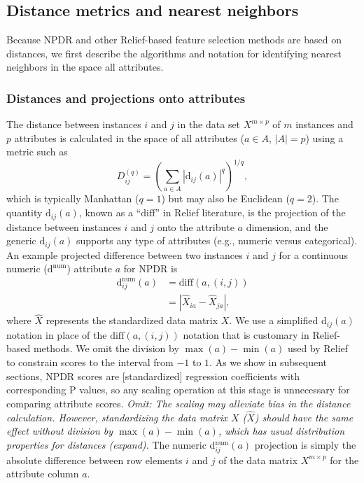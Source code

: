 \documentclass[10pt]{article}
\begin{document}
\subsection{Distance metrics and nearest neighbors}\label{sec:reform}
Because NPDR and other Relief-based feature selection methods are based on distances, we first describe the algorithms and notation for identifying nearest neighbors in the space all attributes. 

\subsubsection{Distances and projections onto attributes}
The distance between instances $i$ and $j$ in the data set $X^{m \times p}$ of $m$ instances and $p$ attributes is calculated in the space of all attributes ($a \in A$, $|A|=p$) using a metric such as
\begin{equation}\label{eq:D}
D^{(q)}_{ij}=\left(\sum_{a\in A}|\text{d}_{ij}(a)|^q\right)^{1/q},
\end{equation}
which is typically Manhattan ($q=1$) but may also be Euclidean ($q=2$). The quantity 
$\text{d}_{ij}(a)$,
known as a ``$\text{diff}$'' in Relief literature, is the projection of the distance between instances $i$ and $j$ onto the attribute $a$ dimension, and the 
generic $\text{d}_{ij}(a)$ supports any type of attributes
(e.g., numeric versus categorical).
An example projected difference between two instances $i$ and $j$ for a continuous numeric ($\text{d}^{\text{num}}$) attribute $a$ for NPDR is
\begin{equation}\label{eq:diff}
\begin{aligned}
\text{d}^{\text{num}}_{ij}(a)&=\text{diff}(a,(i,j))\\
                                            & = {|\hat{X}_{ia}-\hat{X}_{ja}|},
\end{aligned}
\end{equation}
where $\hat{X}$ represents the standardized data matrix $X$.
We use a simplified d$_{ij}(a)$ notation in place of the $\text{diff}(a,(i,j))$ notation that is customary in Relief-based methods.
We omit the division by $\max(a)-\min(a)$ used by Relief to constrain scores to the interval from $-1$ to $1$.
As we show in subsequent sections, NPDR scores are [standardized] regression coefficients with corresponding P values, so any scaling operation at this stage is unnecessary for comparing attribute scores. 
\emph{Omit: The scaling may alleviate bias in the distance calculation. However, standardizing the data matrix $X$ ($\hat{X}$) should have the same effect without division by $\max(a)-\min(a)$, which has usual distribution properties for distances (expand).}
The numeric d$^{\text{num}}_{ij}(a)$ projection is simply the absolute difference between row elements $i$ and $j$ of the data matrix $X^{m \times p}$ for the attribute column $a$. 
\end{document}
